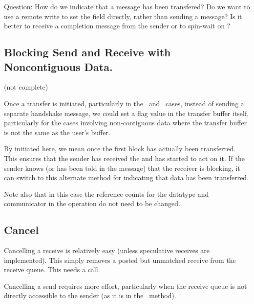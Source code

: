 \begin{via}
  Question: How do we indicate that a message has been transfered?  Do we want
  to use a remote write to set the  field
  directly, rather than sending a message?  Is it better to receive a
  completion message from the sender or to spin-wait on
  ? 

\end{via}

\subsection{Blocking Send and Receive with Noncontiguous Data.}
\label{sec:blocking-optimization}
(not complete)

Once a transfer is initiated, particularly in the \shmemname\ and 
\vianame\ cases, instead of sending a separate handshake message, we could set
a flag 
value in the transfer buffer itself, particularly for the cases involving
non-contiguous data where the transfer buffer is not the same as the user's
buffer.  

By initiated here, we mean once the first block has actually been
transferred.  This ensures that the sender has received the
 and has started to act on it.  If the sender
knows (or has been told in the  message) that
the receiver is blocking, it can switch to this alternate method for
indicating that data has been transferred.

Note also that in this case the reference counts for the datatype and
communicator in the operation do not need to be changed.

\subsection{Cancel}
Cancelling a receive is relatively easy (unless speculative receives
are implemented).   This simply removes a posted but unmatched receive
from the receive queue.  This needs a
 call.

Cancelling a send requires more effort, particularly when the receive
queue is not directly accessible to the sender (as it is in the
\shmemname\ method).  

\subsubsection{\tcpname}
\ifcodefirst
{}
\fi

